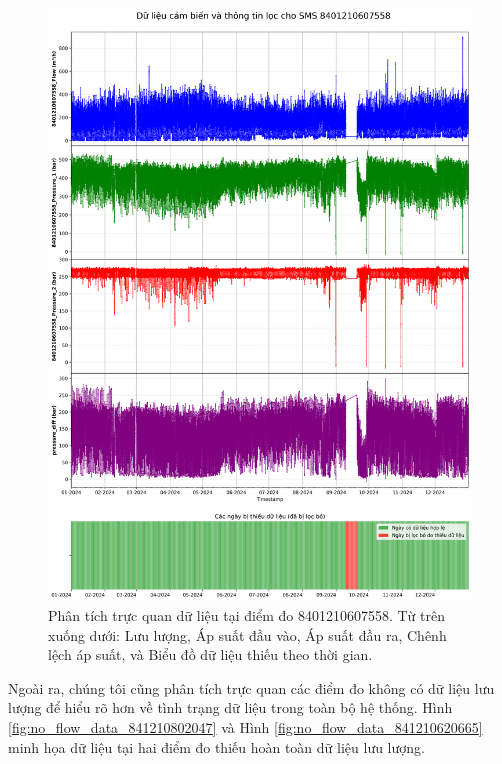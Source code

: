 \begin{figure}[H]
    \centering
    \includegraphics[width=\textwidth]{image/section6_1/timeseries_combined_8401210607558.png}
    \caption{Phân tích trực quan dữ liệu tại điểm đo 8401210607558. Từ trên xuống dưới: Lưu lượng, Áp suất đầu vào, Áp suất đầu ra, Chênh lệch áp suất, và Biểu đồ dữ liệu thiếu theo thời gian.}
    \label{fig:missing_data_visualization_8401210607558}
\end{figure}

Ngoài ra, chúng tôi cũng phân tích trực quan các điểm đo không có dữ liệu lưu lượng để hiểu rõ hơn về tình trạng dữ liệu trong toàn bộ hệ thống. Hình \ref{fig:no_flow_data_841210802047} và Hình \ref{fig:no_flow_data_841210620665} minh họa dữ liệu tại hai điểm đo thiếu hoàn toàn dữ liệu lưu lượng.

